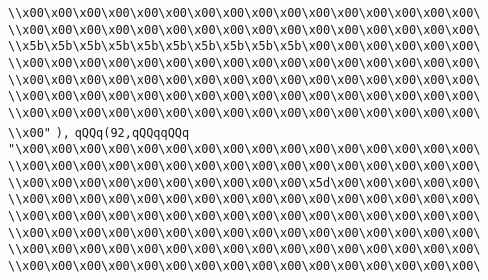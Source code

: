 \verb|\\x00\x00\x00\x00\x00\x00\x00\x00\x00\x00\x00\x00\x00\x00\x00\x00\|\newline
\verb|\\x00\x00\x00\x00\x00\x00\x00\x00\x00\x00\x00\x00\x00\x00\x00\x00\|\newline
\verb|\\x5b\x5b\x5b\x5b\x5b\x5b\x5b\x5b\x5b\x5b\x00\x00\x00\x00\x00\x00\|\newline
\verb|\\x00\x00\x00\x00\x00\x00\x00\x00\x00\x00\x00\x00\x00\x00\x00\x00\|\newline
\verb|\\x00\x00\x00\x00\x00\x00\x00\x00\x00\x00\x00\x00\x00\x00\x00\x00\|\newline
\verb|\\x00\x00\x00\x00\x00\x00\x00\x00\x00\x00\x00\x00\x00\x00\x00\x00\|\newline
\verb|\\x00\x00\x00\x00\x00\x00\x00\x00\x00\x00\x00\x00\x00\x00\x00\x00\|\newline
\verb|\\x00"|\newline
\verb|),|\newline
\verb|qQQq(92,qQQqqQQq|\newline
\verb|"\x00\x00\x00\x00\x00\x00\x00\x00\x00\x00\x00\x00\x00\x00\x00\x00\|\newline
\verb|\\x00\x00\x00\x00\x00\x00\x00\x00\x00\x00\x00\x00\x00\x00\x00\x00\|\newline
\verb|\\x00\x00\x00\x00\x00\x00\x00\x00\x00\x00\x5d\x00\x00\x00\x00\x00\|\newline
\verb|\\x00\x00\x00\x00\x00\x00\x00\x00\x00\x00\x00\x00\x00\x00\x00\x00\|\newline
\verb|\\x00\x00\x00\x00\x00\x00\x00\x00\x00\x00\x00\x00\x00\x00\x00\x00\|\newline
\verb|\\x00\x00\x00\x00\x00\x00\x00\x00\x00\x00\x00\x00\x00\x00\x00\x00\|\newline
\verb|\\x00\x00\x00\x00\x00\x00\x00\x00\x00\x00\x00\x00\x00\x00\x00\x00\|\newline
\verb|\\x00\x00\x00\x00\x00\x00\x00\x00\x00\x00\x00\x00\x00\x00\x00\x00\|\newline

